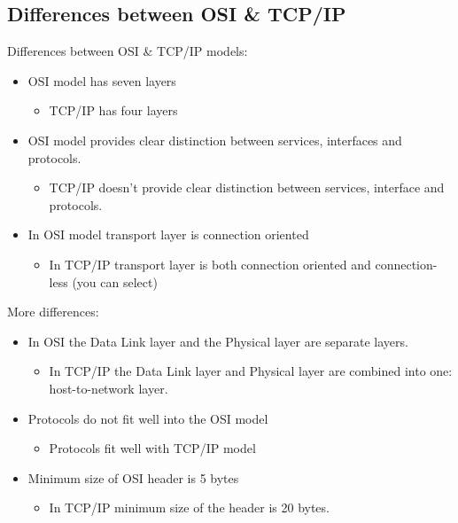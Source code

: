 \documentclass{beamer}[10pt, usepdftitle=false, handout]
\begin{document}
	\subsection{Differences between OSI \& TCP/IP}

	\begin{frame}
	
	Differences between OSI \& TCP/IP models:
	\vspace*{1em}	
	
	\begin{itemize}
	\item{OSI model has seven layers
	\begin{itemize}
	\item{TCP/IP has four layers}
\end{itemize}		
	
	}
	\item{OSI model provides clear distinction between services, interfaces and protocols.
	\begin{itemize}
	\item{TCP/IP doesn't provide clear distinction between services, interface and protocols.}
\end{itemize}		
	
	}
	\item{In OSI model transport layer is connection oriented
	\begin{itemize}
	\item{In TCP/IP transport layer is both connection oriented and connection-less (you can select)}
\end{itemize}		
	
	}
	\end{itemize}

	
	\end{frame}

	\begin{frame}
	
	More differences:
	\vspace*{1em}	
	
	\begin{itemize}
	\item{In OSI the Data Link layer and the Physical layer are separate layers.
		\begin{itemize}
		\item{In TCP/IP the Data Link layer and Physical layer are combined into one: host-to-network layer.}		
		\end{itemize}			
	}
	\item{Protocols do not fit well into the OSI model
	\begin{itemize}
		\item{Protocols fit well with TCP/IP model}
	\end{itemize}}
	\item{Minimum size of OSI header is 5 bytes \begin{itemize}
		\item{In TCP/IP minimum size of the header is 20 bytes.}	
\end{itemize}	 }
\end{itemize}		
	
	\end{frame}
\end{document}
